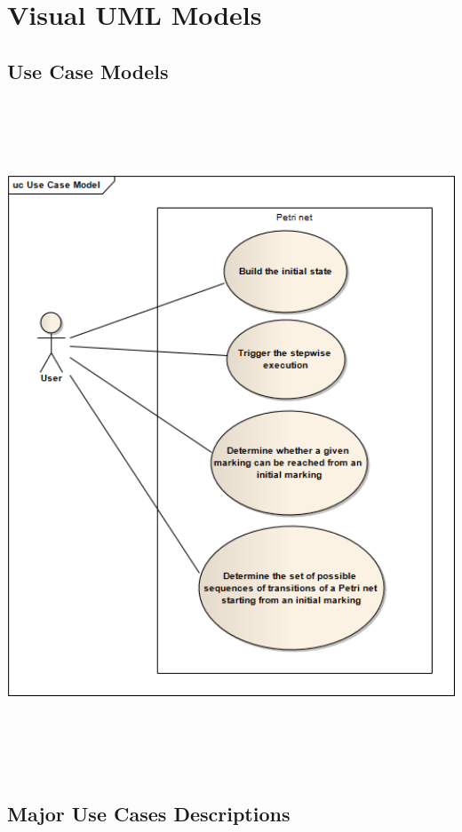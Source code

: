 \documentclass[a4paper]{article}
\begin{document}
\newpage

\section {Visual UML Models}
\subsection {Use Case Models}

\includegraphics[height= 20cm, width=15cm]{Use_Case_Model.png}

\subsection {Major Use Cases Descriptions}	
\end{document}
